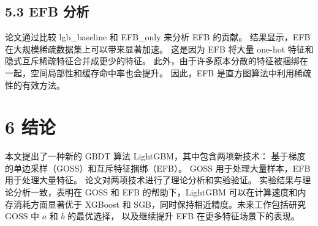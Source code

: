 \subsection{5.3 EFB 分析}

论文通过比较 lgb\_baseline 和 EFB\_only 来分析 EFB 的贡献。
结果显示，EFB 在大规模稀疏数据集上可以带来显著加速。
这是因为 EFB 将大量 one-hot 特征和隐式互斥稀疏特征合并成更少的特征。
此外，由于许多原本分散的特征被捆绑在一起，空间局部性和缓存命中率也会提升。
因此，EFB 是直方图算法中利用稀疏性的有效方法。

\section{6 结论}

本文提出了一种新的 GBDT 算法 LightGBM，其中包含两项新技术：
基于梯度的单边采样（GOSS）和互斥特征捆绑（EFB）。
GOSS 用于处理大量样本，EFB 用于处理大量特征。
论文对两项技术进行了理论分析和实验验证。
实验结果与理论分析一致，表明在 GOSS 和 EFB 的帮助下，LightGBM 可以在计算速度和内存消耗方面显著优于
XGBoost 和 SGB，同时保持相近精度。未来工作包括研究 GOSS 中 $a$ 和 $b$ 的最优选择，
以及继续提升 EFB 在更多特征场景下的表现。

